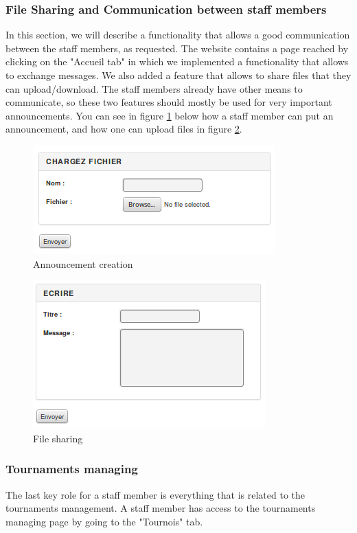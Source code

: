 \documentclass[a4paper, 12pt]{article}
\begin{document}
\subsubsection*{File Sharing and Communication between staff members}

In this section, we will describe a functionality that allows a good communication between the staff members, as requested. The website contains a page reached by clicking on the "Accueil tab" in which we implemented a functionality that allows to exchange messages. We also added a feature that allows to share files that they can upload/download. The staff members already have other means to communicate, so these two features should mostly be used for very important announcements. You can see in figure \ref{annonce} below how a staff member can put an announcement, and how one can upload files in figure \ref{file}.\\

\begin{figure}[h]
  \caption{\label{annonce} Announcement creation}
  \includegraphics[scale=0.7]{annonce.png}
\end{figure}
\FloatBarrier
\begin{figure}[h]
  \caption{\label{file} File sharing}
  \includegraphics[scale=0.7]{fichier.png}
\end{figure}
\FloatBarrier

 \newpage


\subsubsection*{Tournaments managing}
The last key role for a staff member is everything that is related to the tournaments management. A staff member has access to the tournaments managing page by going to the "Tournois" tab.\\
\end{document}

